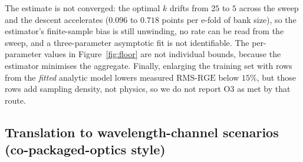 \documentclass[11pt]{article}
\newcommand{\rge}{\mathrm{RMS\text{-}RGE}}
\begin{document}
The estimate is not converged: the optimal $k$ drifts from $25$ to $5$ across the sweep and the descent accelerates ($0.096$ to $0.718$ points per e-fold of bank size), so the estimator's finite-sample bias is still unwinding, no rate can be read from the sweep, and a three-parameter asymptotic fit is not identifiable. The per-parameter values in Figure~\ref{fig:floor} are not individual bounds, because the estimator minimises the aggregate. Finally, enlarging the training set with rows from the \emph{fitted} analytic model lowers measured $\rge$ below $15\%$, but those rows add sampling density, not physics, so we do not report O3 as met by that route.


\subsection{Translation to wavelength-channel scenarios (co-packaged-optics style)}
\label{sec:cpo}
\end{document}
